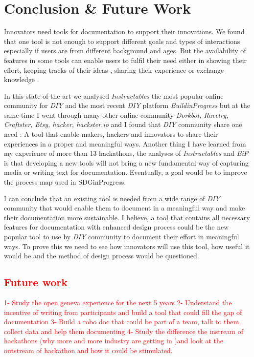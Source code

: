 \section{Conclusion \& Future Work}

Innovators need tools for documentation to support their innovations. We found that one tool is not enough to support different goals and types of interactions especially if users are from different background and ages. But the availability of features in some tools can enable users to fulfil their need either in showing their effort, keeping tracks of their ideas \cite{Wakkary:2015:TAH:2702123.2702550}, sharing their experience or exchange knowledge \cite{doi:10.1287/orsc.1070.0325}. 

In this state-of-the-art we analysed \textit{Instructables} the most popular online community for \textit{DIY} and the most recent \textit{DIY} platform \textit{BuildinProgress} but at the same time I went through many other online community \textit{Dorkbot, Ravelry, Craftster, Etsy, hacker, hackster.io} and I found that \textit{DIY} community share one need : A tool that enable makers, hackers and innovators to share their experiences in  a proper and meaningful ways.  Another thing I have learned from my experience of more than 13 hackathons, the analyses of \textit{Instructables}  and \textit{BiP} is that developing a new tools will not bring a new fundamental way of capturing media or writing text for documentation. Eventually, a goal would be to improve the process map used in SDGinProgress. 

I can conclude that an existing tool is needed from a wide range of \textit{DIY} community that would enable them to document in a meaningful way and make their documentation more sustainable. I believe, a tool that contains all necessary features for documentation with enhanced design process could be the new popular tool to use by \textit{DIY} community to document their effort in meaningful ways. To prove this we need to see how innovators will use this tool, how useful it would be and the method of design process would be questioned.


\textcolor{red}{
\section{Future work}
1- Study the open geneva experience for the next 5 years
2- Understand the incentive of writing from participants and build a tool that could fill the gap of documentation
3- Build a robo doc that could be part of a team, talk to them, collect data and help them documenting
4- Study the difference  the instream of hackathons (why more and more industry are getting in )and look at the outstream of hackathon and how it could be stimulated.}